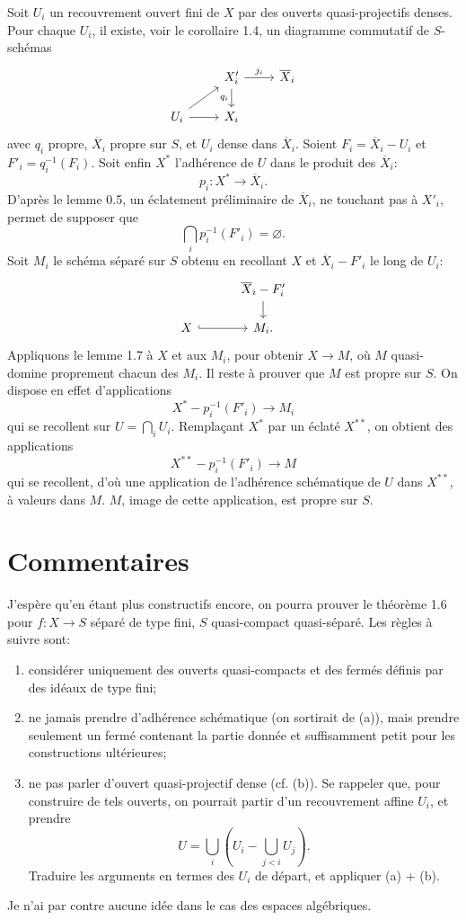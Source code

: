 \documentclass[10pt,a4paper]{article}
\theoremstyle{deligne}
\begin{document}
Soit \(U_i\) un recouvrement ouvert fini de \(X\) par des ouverts quasi-projectifs denses. Pour chaque \(U_i\), il existe, voir le corollaire 1.4, un diagramme commutatif de \(S\)-schémas
\[
\begin{tikzcd}[column sep=2.4em,row sep=1.5em]
& X'_i \arrow[r,"j_i"] \arrow[d,"q_i"'] & \overline X_i \\
U_i \arrow[ur] \arrow[r] & X_i
\end{tikzcd}
\]
avec \(q_i\) propre, \(\overline X_i\) propre sur \(S\), et \(U_i\) dense dans \(\overline X_i\). Soient \(F_i=\overline X_i-U_i\) et \(F'_i=q_i^{-1}(F_i)\). Soit enfin \(X^*\) l'adhérence de \(U\) dans le produit des \(\overline X_i\):
\[
p_i:X^*\longrightarrow \overline X_i.
\]
D'après le lemme 0.5, un éclatement préliminaire de \(\overline X_i\), ne touchant pas à \(X'_i\), permet de supposer que
\[
\bigcap_i p_i^{-1}(F'_i)=\varnothing.
\]
Soit \(M_i\) le schéma séparé sur \(S\) obtenu en recollant \(X\) et \(\overline X_i-F'_i\) le long de \(U_i\):
\[
\begin{tikzcd}[column sep=3em,row sep=1.4em]
& \overline X_i-F'_i \arrow[d] \\
X \arrow[r,hook] & M_i .
\end{tikzcd}
\]
Appliquons le lemme 1.7 à \(X\) et aux \(M_i\), pour obtenir \(X\to M\), où \(M\) quasi-domine proprement chacun des \(M_i\). Il reste à prouver que \(M\) est propre sur \(S\). On dispose en effet d'applications
\[
X^*-p_i^{-1}(F'_i)\longrightarrow M_i
\]
qui se recollent sur \(U=\bigcap_i U_i\). Remplaçant \(X^*\) par un éclaté \(X^{**}\), on obtient des applications
\[
X^{**}-p_i^{-1}(F'_i)\longrightarrow M
\]
qui se recollent, d'où une application de l'adhérence schématique de \(U\) dans \(X^{**}\), à valeurs dans \(M\). \(M\), image de cette application, est propre sur \(S\).

\section*{Commentaires}

J'espère qu'en étant plus constructifs encore, on pourra prouver le théorème 1.6 pour \(f:X\to S\) séparé de type fini, \(S\) quasi-compact quasi-séparé. Les règles à suivre sont:
\begin{enumerate}[label=(\alph*)]
\item considérer uniquement des ouverts quasi-compacts et des fermés définis par des idéaux de type fini;
\item ne jamais prendre d'adhérence schématique (on sortirait de (a)), mais prendre seulement un fermé contenant la partie donnée et suffisamment petit pour les constructions ultérieures;
\item ne pas parler d'ouvert quasi-projectif dense (cf. (b)). Se rappeler que, pour construire de tels ouverts, on pourrait partir d'un recouvrement affine \(U_i\), et prendre
\[
U=\bigcup_i\left(U_i-\bigcup_{j<i}U_j\right).
\]
Traduire les arguments en termes des \(U_i\) de départ, et appliquer (a) + (b).
\end{enumerate}
Je n'ai par contre aucune idée dans le cas des espaces algébriques.
\end{document}
